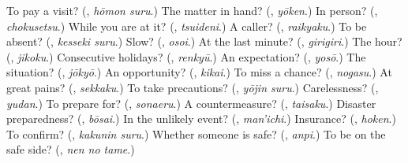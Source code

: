 \begin{tcolorbox}[breakable,colback=teal!4,colframe=teal!35!black,title={Before you move on}]
To pay a visit? (\textbf{}, \emph{hōmon suru}.) The matter in hand? (\textbf{}, \emph{yōken}.) In person? (\textbf{}, \emph{chokusetsu}.) While you are at it? (\textbf{}, \emph{tsuideni}.) A caller? (\textbf{}, \emph{raikyaku}.) To be absent? (\textbf{}, \emph{kesseki suru}.) Slow? (\textbf{}, \emph{osoi}.) At the last minute? (\textbf{}, \emph{girigiri}.) The hour? (\textbf{}, \emph{jikoku}.) Consecutive holidays? (\textbf{}, \emph{renkyū}.) An expectation? (\textbf{}, \emph{yosō}.) The situation? (\textbf{}, \emph{jōkyō}.) An opportunity? (\textbf{}, \emph{kikai}.) To miss a chance? (\textbf{}, \emph{nogasu}.) At great pains? (\textbf{}, \emph{sekkaku}.) To take precautions? (\textbf{}, \emph{yōjin suru}.) Carelessness? (\textbf{}, \emph{yudan}.) To prepare for? (\textbf{}, \emph{sonaeru}.) A countermeasure? (\textbf{}, \emph{taisaku}.) Disaster preparedness? (\textbf{}, \emph{bōsai}.) In the unlikely event? (\textbf{}, \emph{man'ichi}.) Insurance? (\textbf{}, \emph{hoken}.) To confirm? (\textbf{}, \emph{kakunin suru}.) Whether someone is safe? (\textbf{}, \emph{anpi}.) To be on the safe side? (\textbf{}, \emph{nen no tame}.)
\end{tcolorbox}

